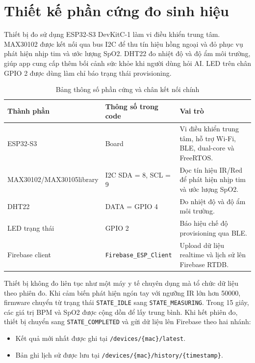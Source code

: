 \documentclass[a4paper,13pt,3p,oneside]{report}
\newcommand{\code}[1]{\begingroup\ttfamily\seqsplit{#1}\endgroup}
\begin{document}
\section{Thiết kế phần cứng đo sinh hiệu}
Thiết bị đo sử dụng ESP32-S3 DevKitC-1 làm vi điều khiển trung tâm. MAX30102 được kết nối qua bus I2C để thu tín hiệu hồng ngoại và đỏ phục vụ phát hiện nhịp tim và ước lượng SpO2. DHT22 đo nhiệt độ và độ ẩm môi trường, giúp app cung cấp thêm bối cảnh sức khỏe khi người dùng hỏi AI. LED trên chân GPIO 2 được dùng làm chỉ báo trạng thái provisioning.

\begin{table}[H]
\centering
\caption{Bảng thông số phần cứng và chân kết nối chính}
\renewcommand{\arraystretch}{1.25}
\setlength{\tabcolsep}{5pt}
\begin{tabularx}{\textwidth}{p{3cm}p{5cm}X}
\toprule
\textbf{Thành phần} & \textbf{Thông số trong code} & \textbf{Vai trò} \\
\midrule
ESP32-S3 & Board \code{esp32-s3-devkitc-1} & Vi điều khiển trung tâm, hỗ trợ Wi-Fi, BLE, dual-core và FreeRTOS. \\
MAX30102/\newline MAX30105\newline library & I2C SDA = 8, SCL = 9 & Đọc tín hiệu IR/Red để phát hiện nhịp tim và ước lượng SpO2. \\
DHT22 & DATA = GPIO 4 & Đo nhiệt độ và độ ẩm môi trường. \\
LED trạng thái & GPIO 2 & Báo hiệu chế độ provisioning qua BLE. \\
Firebase client & \texttt{Firebase\_ESP\_Client} & Upload dữ liệu realtime và lịch sử lên Firebase RTDB. \\
\bottomrule
\end{tabularx}
\end{table}

Thiết bị không đo liên tục như một máy y tế chuyên dụng mà tổ chức dữ liệu theo phiên đo. Khi cảm biến phát hiện ngón tay với ngưỡng IR lớn hơn 50000, firmware chuyển từ trạng thái \texttt{STATE\_IDLE} sang \texttt{STATE\_MEASURING}. Trong 15 giây, các giá trị BPM và SpO2 được cộng dồn để lấy trung bình. Khi hết phiên đo, thiết bị chuyển sang \texttt{STATE\_COMPLETED} và gửi dữ liệu lên Firebase theo hai nhánh:

\begin{itemize}
    \item Kết quả mới nhất được ghi tại \texttt{/devices/\{mac\}/latest}.
    \item Bản ghi lịch sử được lưu tại \texttt{/devices/\{mac\}/history/\{timestamp\}}.
\end{itemize}
\end{document}
